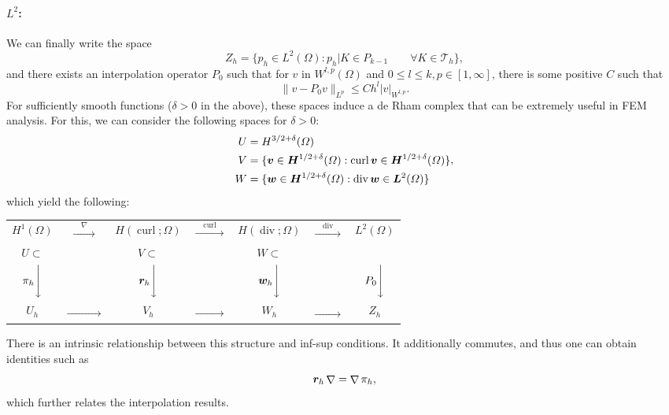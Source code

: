 \documentclass{article}
\renewcommand{\vec}{\vectorsym}
\DeclareMathOperator{\grad}{\nabla}
\DeclareMathOperator{\dive}{\text{div}}
\DeclareMathOperator{\curl}{\text{curl}}
\newcommand{\T}{\mathcal{T}}
\begin{document}
\paragraph{$L^2$:} We can finally write the space 
    $$ Z_h = \{ p_h \in L^2(\Omega): p_h|K \in P_{k-1} \qquad \forall K\in \T_h\}, $$
and there exists an interpolation operator $P_0$ such that for $v$ in $W^{l,p}(\Omega)$ and $0\leq l \leq k, p\in[1,\infty]$, there is some positive $C$ such that
    $$ \| v - P_0v\|_{L^p} \leq C h^l |v|_{W^{l,p}}. $$
For sufficiently smooth functions ($\delta>0$ in the above), these spaces induce a de Rham complex that can be extremely useful in FEM analysis. For this, we can consider the following spaces for $\delta > 0$: 
    $$
    \begin{aligned}
        U &= H^{3/2+\delta}(\Omega) \\
        V &= \{\vec v \in \vec H^{1/2+\delta}(\Omega) : \curl \vec v \in \vec H^{1/2+\delta}(\Omega)\} \\
        W &= \{ \vec w \in \vec H^{1/2+\delta}(\Omega): \dive \vec w \in \vec L^2(\Omega) \}
    \end{aligned},
    $$
which yield the following: 

    \begin{center} 
    \begin{tabular}{ccccccc}
    $H^1(\Omega)$ & $\xrightarrow{\quad\nabla\quad}$& $H(\curl;\Omega)$ & $\xrightarrow{\quad\curl\quad}$ & $H(\dive;\Omega)$ & $\xrightarrow{\quad\dive\quad} $ & $L^2(\Omega)$ \\
    $U\subset$ & & $V\subset$ & & $W \subset$ & &  \\
    $\pi_h \Bigg\downarrow$ && $\vec r_h \Bigg\downarrow$ && $\vec w_h\Bigg\downarrow$ && $P_0 \Bigg\downarrow$ \\
    $U_h$ & $\xrightarrow{\quad\phantom{nabla}\quad}$& $V_h$ & $\xrightarrow{\quad\phantom{\curl}\quad}$ & $W_h$ & $\xrightarrow{\quad\phantom{\dive}\quad} $ & $Z_h$ \\
    \end{tabular}
    \end{center} 
There is an intrinsic relationship between this structure and inf-sup conditions. It additionally commutes, and thus one can obtain identities such as 
    $$ \vec r_h \grad = \grad \pi_h, $$
which further relates the interpolation results. 
\end{document}
